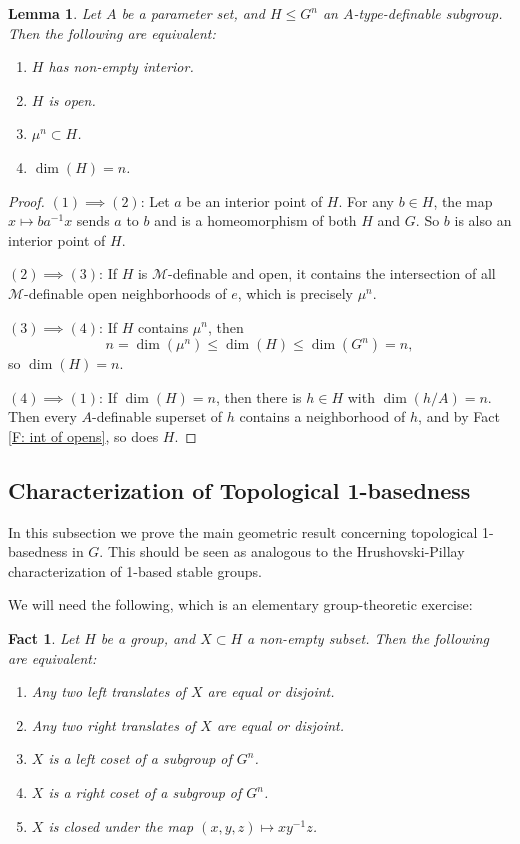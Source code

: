 \documentclass{amsart}
\newtheorem{fact}[theorem]{Fact}
\newtheorem{lemma}[theorem]{Lemma}
\theoremstyle{definition}
\begin{document}
\begin{lemma}\label{L: big subgroups}
    Let $A$ be a parameter set, and $H\leq G^n$ an $A$-type-definable subgroup. Then the following are equivalent:
    \begin{enumerate}
        \item $H$ has non-empty interior.
        \item $H$ is open.
        \item $\mu^n\subset H$.
        \item $\dim(H)=n$.
    \end{enumerate}
\end{lemma}
\begin{proof}
$(1)\implies(2)$: Let $a$ be an interior point of $H$. For any $b\in H$, the map $x\mapsto ba^{-1}x$ sends $a$ to $b$ and is a homeomorphism of both $H$ and $G$. So $b$ is also an interior point of $H$.

$(2)\implies(3)$: If $H$ is $\mathcal M$-definable and open, it contains the intersection of all $\mathcal M$-definable open neighborhoods of $e$, which is precisely $\mu^n$.

$(3)\implies(4)$: If $H$ contains $\mu^n$, then $$n=\dim(\mu^n)\leq\dim(H)\leq\dim(G^n)=n,$$ so $\dim(H)=n$.

$(4)\implies(1)$: If $\dim(H)=n$, then there is $h\in H$ with $\dim(h/A)=n$. Then every $A$-definable superset of $h$ contains a neighborhood of $h$, and by Fact \ref{F: int of opens}, so does $H$. 
\end{proof}

\subsection{Characterization of Topological 1-basedness}

In this subsection we prove the main geometric result concerning topological 1-basedness in $G$. This should be seen as analogous to the Hrushovski-Pillay characterization of 1-based stable groups.

We will need the following, which is an elementary group-theoretic exercise:

\begin{fact}\label{F: easy group facts}
    Let $H$ be a group, and $X\subset H$ a non-empty subset. Then the following are equivalent:
    \begin{enumerate}
        \item Any two left translates of $X$ are equal or disjoint.
        \item Any two right translates of $X$ are equal or disjoint.
        \item $X$ is a left coset of a subgroup of $G^n$.
        \item $X$ is a right coset of a subgroup of $G^n$.
        \item $X$ is closed under the map $(x,y,z)\mapsto xy^{-1}z$.
    \end{enumerate}
\end{fact}
\end{document}
